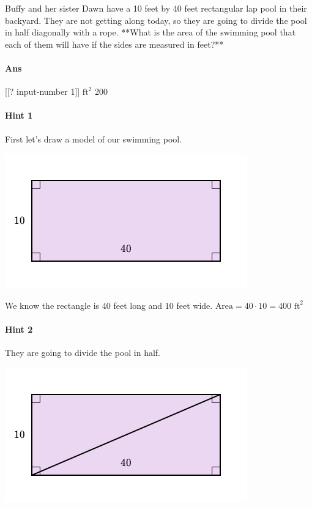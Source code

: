 \documentclass[twocolumn,10pt]{article}
\def\shrinkfactor{0.55}
\begin{document}
\noindent
Buffy and her sister Dawn have a 10 feet by 40 feet rectangular lap pool in their backyard.  They are not getting along today, so they are going to divide the pool in half diagonally with a rope.  **What is the area of the swimming pool that each of them will have if the sides are measured in feet?**  

\paragraph{Ans}  [[? input-number 1]] $\text{ft}^2$  200

\paragraph{Hint 1}First let's draw a model of our swimming pool.  


\includegraphics[scale=\shrinkfactor]{figures/19902d36cb6bfded708f436f2951427d0b173e94.png}  

We know the rectangle is $40$ feet long and $10$ feet wide.  
${\text{Area}}=40\cdot10=400\text{ ft}^2$  

\paragraph{Hint 2}They are going to divide the pool in half.  

\includegraphics[scale=\shrinkfactor]{figures/2f77060cc398289e1491af1f812dcd21706f3116.png}  
\end{document}
